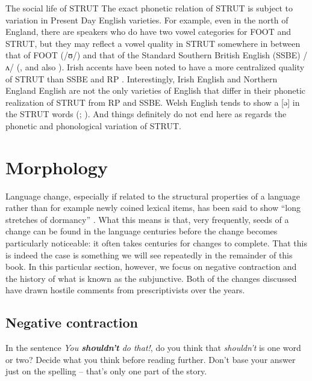 \begin{soundbox}{The social life of STRUT}
The exact phonetic relation of STRUT is subject to variation in Present Day English varieties. For example, even in the north of England, there are speakers who do have two vowel categories for FOOT and STRUT, but they may reflect a vowel quality in STRUT somewhere in between that of FOOT (/ʊ/) and that of the Standard Southern British English (SSBE) /ʌ/ (\citealp[111]{ChambersTrudgill1998}, and also \citealp{BaranowskiTurton2018}). Irish accents have been noted to have a more centralized quality of STRUT than SSBE and RP \citep[421]{Wells1982b}. Interestingly, Irish English and Northern England English are not the only varieties of English that differ in their phonetic realization of STRUT from RP and SSBE. Welsh English tends to show a [ə] in the STRUT words (\citealp{Hejna2018}; \citealp[383]{Wells1982b}). And things definitely do not end here as regards the phonetic and phonological variation of STRUT.
\end{soundbox}

\section{Morphology}\label{LModE-morphology}
Language change, especially if related to the structural properties of a language rather than for example newly coined lexical items, has been said to show ``long stretches of dormancy'' \citep[96]{Strang1970}. What this means is that, very frequently, seeds of a change can be found in the language centuries before the change becomes particularly noticeable: it often takes centuries for changes to complete. That this is indeed the case is something we will see repeatedly in the remainder of this book. In this particular section, however, we focus on negative contraction and the history of what is known as the subjunctive. Both of the changes discussed have drawn hostile comments from prescriptivists over the years.

\subsection{Negative contraction}\label{LME-contraction}
In the sentence \textit{You \textbf{shouldn't} do that!}, do you think that \textit{shouldn't} is one word or two? Decide what you think before reading further. Don't base your answer just on the spelling -- that's only one part of the story.

